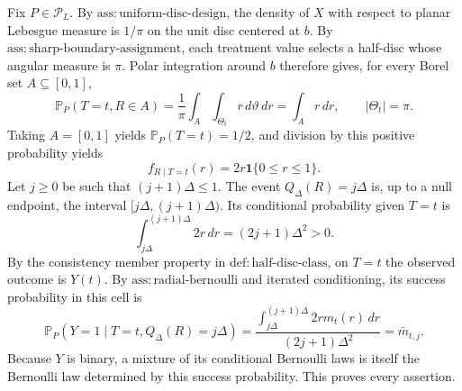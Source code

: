 Fix \(P\in\mathcal P_L\).  By \(\mathrm{ass:uniform\text{-}disc\text{-}design}\), the density of \(X\) with respect to planar Lebesgue measure is \(1/\pi\) on the unit disc centered at \(b\).  By \(\mathrm{ass:sharp\text{-}boundary\text{-}assignment}\), each treatment value selects a half-disc whose angular measure is \(\pi\).  Polar integration around \(b\) therefore gives, for every Borel set \(A\subseteq[0,1]\),
\[
 \mathbb P_P(T=t,R\in A)
 =\frac{1}{\pi}\int_A\int_{\Theta_t}r\,d\vartheta\,dr
 =\int_A r\,dr,
 \qquad |\Theta_t|=\pi.
\]
Taking \(A=[0,1]\) yields \(\mathbb P_P(T=t)=1/2\), and division by this positive probability yields
\[
 f_{R\mid T=t}(r)=2r\mathbf 1\{0\le r\le1\}.
\]
Let \(j\ge0\) be such that \((j+1)\Delta\le1\).  The event \(Q_\Delta(R)=j\Delta\) is, up to a null endpoint, the interval \([j\Delta,(j+1)\Delta)\).  Its conditional probability given \(T=t\) is
\[
 \int_{j\Delta}^{(j+1)\Delta}2r\,dr=(2j+1)\Delta^2>0.
\]
By the consistency member property in \(\mathrm{def:half\text{-}disc\text{-}class}\), on \(T=t\) the observed outcome is \(Y(t)\).  By \(\mathrm{ass:radial\text{-}bernoulli}\) and iterated conditioning, its success probability in this cell is
\[
 \mathbb P_P(Y=1\mid T=t,Q_\Delta(R)=j\Delta)
 =\frac{\int_{j\Delta}^{(j+1)\Delta}2r m_t(r)\,dr}
 {(2j+1)\Delta^2}
 =\bar m_{t,j}.
\]
Because \(Y\) is binary, a mixture of its conditional Bernoulli laws is itself the Bernoulli law determined by this success probability.  This proves every assertion.